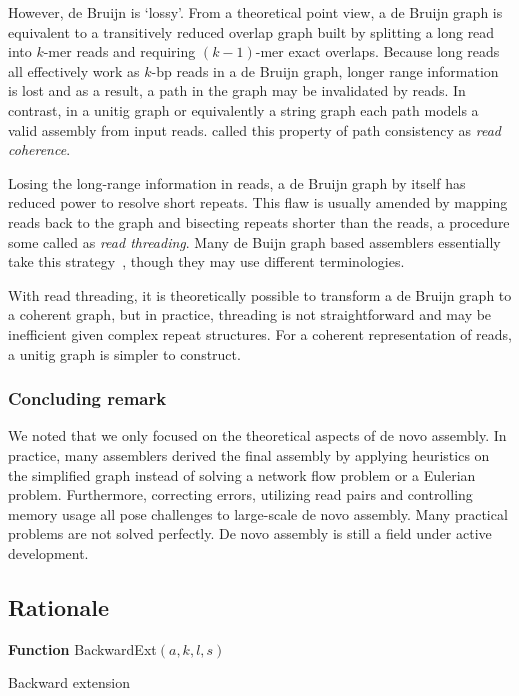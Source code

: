 \documentclass{bioinfo}
\begin{document}
\begin{methods}
However, de Bruijn is `lossy'. From a theoretical point view, a de Bruijn graph
is equivalent to a transitively reduced overlap graph built by splitting a long
read into $k$-mer reads and requiring $(k-1)$-mer exact overlaps. Because
long reads all effectively work as $k$-bp reads in a de Bruijn graph, longer
range information is lost and as a result, a path in the graph may be
invalidated by reads. In contrast, in a unitig graph or equivalently a string
graph each path models a valid assembly from input reads. \citet{Myers:2005bh}
called this property of path consistency as \emph{read coherence}.

Losing the long-range information in reads, a de Bruijn graph by itself has
reduced power to resolve short repeats. This flaw is usually amended by mapping
reads back to the graph and bisecting repeats shorter than the reads, a procedure
some called as \emph{read threading}. Many de Buijn graph based assemblers
essentially take this
strategy~\citep{Pevzner:2001vn,Chaisson:2009fk,Zerbino:2009ly,Li:2010vn},
though they may use different terminologies.

With read threading, it is theoretically possible to transform a de Bruijn graph
to a coherent graph, but in practice, threading is not straightforward and
may be inefficient given complex repeat structures. For a coherent representation
of reads, a unitig graph is simpler to construct.

\subsubsection{Concluding remark}
We noted that we only focused on the theoretical aspects of de novo assembly.
In practice, many assemblers derived the final assembly by applying heuristics
on the simplified graph instead of solving a network flow problem or a Eulerian
problem. Furthermore, correcting errors, utilizing read pairs and controlling memory
usage all pose challenges to large-scale de novo assembly. Many practical
problems are not solved perfectly. De novo assembly is still a field under
active development.

\subsection{Rationale}

\begin{algorithm}[h]
\DontPrintSemicolon
\footnotesize
{}
\BlankLine
\textbf{Function} {\sc BackwardExt}$(a,k,l,s)$
\caption{Backward extension}
\end{algorithm}


\end{methods}
\end{document}

